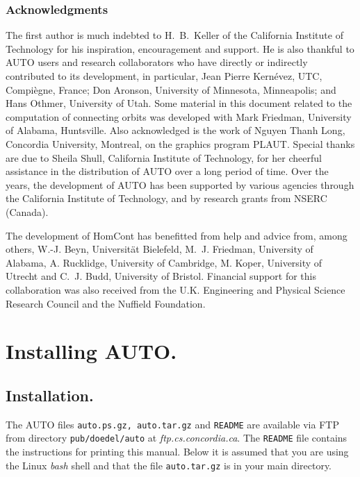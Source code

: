 \documentclass[12pt]{report}
\begin{document}
\subsection*{Acknowledgments}
The first author is much indebted to H.~B.~Keller 
of the California Institute of Technology for his inspiration,
encouragement and support.
He is also thankful to {\cal AUTO} users and research collaborators who have 
directly or indirectly contributed to its development,
in particular, 
Jean Pierre Kern\'evez, UTC, Compi\`egne, France;
Don Aronson, University of Minnesota, Minneapolis; and 
Hans Othmer, University of Utah.
Some material in this document related to the computation of connecting orbits
was developed with Mark Friedman, University of Alabama, Huntsville.
Also acknowledged is the work of Nguyen Thanh Long,
Concordia University, Montreal, on the graphics program {\cal PLAUT}.
Special thanks are due to Sheila Shull, California Institute of Technology,
for her cheerful assistance in the distribution of {\cal AUTO} over a long period
of time.
Over the years, the development of {\cal AUTO} has been supported by
various agencies through the California Institute of Technology, and
by research grants from NSERC (Canada).

The development of {\cal HomCont} has benefitted from help and advice from, 
among others, 
W.-J. Beyn, Universit\"{a}t Bielefeld,
M.~J. Friedman, University of Alabama,
A. Rucklidge, University of Cambridge, 
M. Koper, University of Utrecht and 
C.~J. Budd, University of Bristol. 
Financial support for this collaboration was also received from the U.K.
Engineering and Physical Science Research Council and the Nuffield Foundation.

\chapter{Installing {\cal AUTO}.} \label{ch:Installing_AUTO}
\section{ Installation.} \label{sec:Installation}
The {\cal AUTO} files {\tt auto.ps.gz, auto.tar.gz} and {\tt README} 
are available via FTP from 
directory {\tt pub/doedel/auto} at {\it ftp.cs.concordia.ca}.
The {\tt README} file contains the instructions for printing this manual.
Below it is assumed that you are using the Linux {\it bash} shell 
and that the file {\tt auto.tar.gz} is in your main directory.
\end{document}
